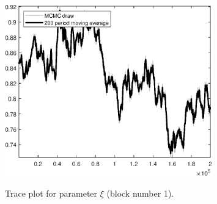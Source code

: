 \begin{figure}[H]
\centering
  \includegraphics[width=0.8\textwidth]{BRS_sectoral_rest/graphs/TracePlot_xi_blck_1}\\
    \caption{Trace plot for parameter $\xi$ (block number 1).}
\end{figure}
